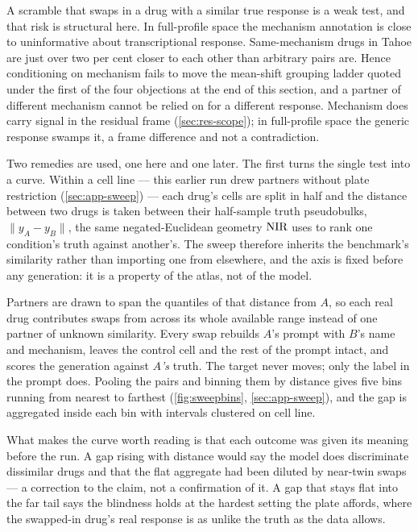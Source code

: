 A scramble that swaps in a drug with a similar true response is a weak test, and
that risk is structural here. In full-profile space the mechanism annotation is
close to uninformative about transcriptional response. Same-mechanism drugs in
Tahoe are just over two per cent closer to each other than arbitrary pairs
are.
Hence conditioning on mechanism fails to move the mean-shift grouping ladder quoted under the first of the four objections at the end of this section, and a partner of different mechanism cannot be relied on
for a different response. Mechanism does carry signal in the residual frame
(\cref{sec:res-scope}); in full-profile space the generic response swamps it, a
frame difference and not a contradiction.

Two remedies are used, one here and one later. The first turns the single test
into a curve. Within a cell line --- this earlier run drew partners without plate restriction (\cref{sec:app-sweep}) --- each drug's cells are split in half and the distance between two drugs is taken between their half-sample truth pseudobulks, $\lVert y_A - y_B \rVert$, the same negated-Euclidean geometry $\textrm{NIR}$ uses to rank one condition's truth against another's. The sweep therefore inherits the benchmark's similarity rather than importing one from elsewhere, and the axis is fixed before any generation: it is a property of the atlas, not of the model.

Partners are drawn to span the quantiles of that distance from $A$, so each real
drug contributes swaps from across its whole available range instead of one
partner of unknown similarity. Every swap rebuilds $A$'s prompt with $B$'s name
and mechanism, leaves the control cell and the rest of the prompt intact, and
scores the generation against \emph{$A$'s} truth. The target never moves; only
the label in the prompt does. Pooling the pairs and binning them by distance
gives five bins running from nearest to farthest
(\cref{fig:sweepbins}, \cref{sec:app-sweep}), and the gap is aggregated inside
each bin with intervals clustered on cell line.

What makes the curve worth reading is that each outcome was given its meaning
before the run. A gap rising with distance would say the model does discriminate
dissimilar drugs and that the flat aggregate had been diluted by near-twin swaps
--- a correction to the claim, not a confirmation of it. A gap that stays flat
into the far tail says the blindness holds at the hardest setting the plate
affords, where the swapped-in drug's real response is as unlike the truth as the
data allows.

